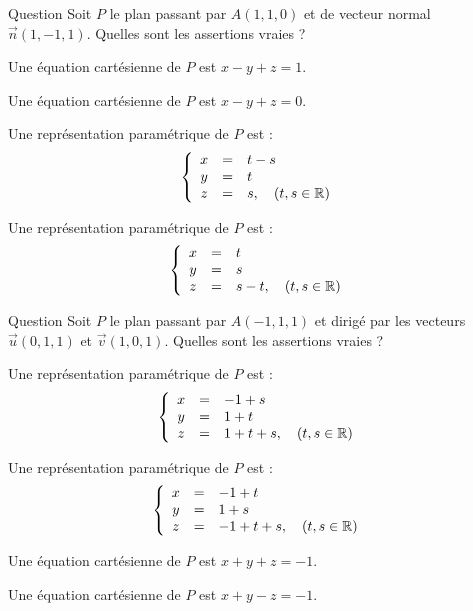 \begin{multi}[multiple,feedback=
{Une équation de \(P\) est de la forme : \(x-y+z+a=0\) et on cherche \(a\) pour que \(A\) appartienne à \(P\). On résout cette équation pour trouver une représentation paramétrique. 
}]{Question}
Soit \(P\) le plan passant par \(A(1,1,0)\) et  de vecteur normal \(\vec{n}(1,-1,1)\). Quelles sont les assertions vraies ?

    \item Une équation cartésienne de \(P\) est \(x-y+z=1\).
    \item* Une équation cartésienne de \(P\) est \(x-y+z=0\).
    \item* Une représentation paramétrique de \(P\) est :
\[\left\{\begin{array}{ccl}x&=&t-s\\y&=&t\\ z&=&s,\quad (t,s\in \mathbb{R}) \end{array}\right.\]
    \item* Une représentation paramétrique de \(P\) est :
\[\left\{\begin{array}{ccl}x&=&t\\y&=&s\\ z&=&s-t,\quad (t,s \in \mathbb{R})\end{array}\right.\]
\end{multi}


\begin{multi}[multiple,feedback=
{On peut trouver une équation cartésienne, à partir d'une représentation paramétrique,  en éliminant les paramètres.
}]{Question}
Soit \(P\) le plan passant par \(A(-1,1,1)\) et dirigé par les vecteurs
\(\vec{u}(0,1,1)\) et \(\vec{v}(1,0,1)\). Quelles sont les assertions vraies ?

    \item* Une représentation paramétrique de \(P\) est :
\[\left\{\begin{array}{ccl}x&=&-1+s\\y&=&1+t\\ z&=&1+t+s,\quad (t,s\in \mathbb{R}) \end{array}\right.\]
    \item Une représentation paramétrique de \(P\) est :
\[\left\{\begin{array}{ccl}x&=&-1+t\\y&=&1+s\\ z&=&-1+t+s,\quad (t,s\in \mathbb{R})\end{array}\right.\]
    \item Une équation cartésienne de \(P\) est \(x+y+z=-1\).
    \item* Une équation cartésienne de \(P\) est \(x+y-z=-1\).
\end{multi}



